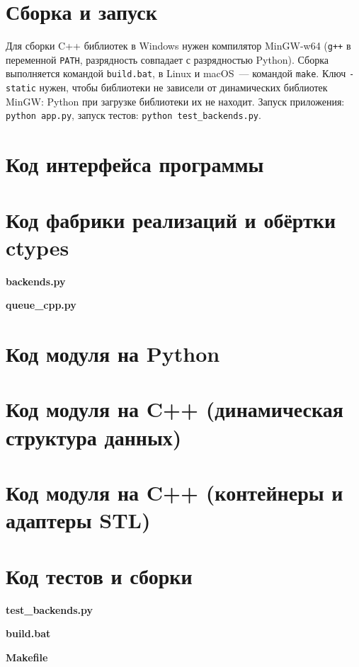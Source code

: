 \documentclass[oneside,a4paper,14pt]{extarticle} %
\newcommand{\code}[3]{%
  \par\noindent\textbf{#3}\par\vspace{2pt}
  }
\begin{document}
\section{Сборка и запуск}
Для сборки C++ библиотек в Windows нужен компилятор MinGW-w64 (\texttt{g++} в переменной \texttt{PATH}, разрядность совпадает с разрядностью Python). Сборка выполняется командой \texttt{build.bat}, в Linux и macOS~--- командой \texttt{make}. Ключ \texttt{-static} нужен, чтобы библиотеки не зависели от динамических библиотек MinGW: Python при загрузке библиотеки их не находит. Запуск приложения: \texttt{python app.py}, запуск тестов: \texttt{python test\_backends.py}.

\clearpage
\section{Код интерфейса программы}


\clearpage
\section{Код фабрики реализаций и обёртки ctypes}
\code{Python}{backends.py}{backends.py}
\code{Python}{queue_cpp.py}{queue\_cpp.py}

\section{Код модуля на Python}


\section{Код модуля на C++ (динамическая структура данных)}


\section{Код модуля на C++ (контейнеры и адаптеры STL)}


\section{Код тестов и сборки}
\code{Python}{test_backends.py}{test\_backends.py}
\code{}{build.bat}{build.bat}
\code{make}{Makefile}{Makefile}
\end{document}
